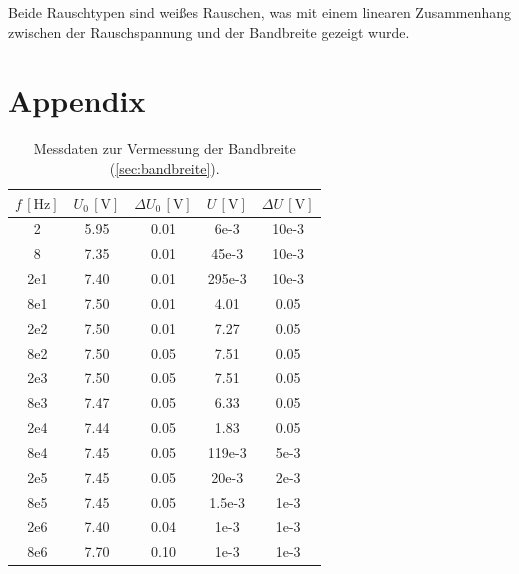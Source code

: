 \documentclass[sn-mathphys-num,iicol]{sn-jnl}
\theoremstyle{thmstyleone}
\theoremstyle{thmstyletwo}
\theoremstyle{thmstylethree}
\begin{document}
Beide Rauschtypen sind weißes Rauschen, was mit einem linearen Zusammenhang zwischen der Rauschspannung und der Bandbreite gezeigt wurde.

\clearpage
\section{Appendix}
\begin{table}[h]
    \begin{tabular}{S[table-format=1.2e1] S[table-format=1.2] S[table-format=1.2] S[table-format=1.2e1] S[table-format=1.2e1]}
        \toprule
        {\(f\,[\si{\hertz}]\)} & {\(U_0\,[\si{\volt}]\)} & {\(\Delta U_0\,[\si{\volt}]\)} & {\(U\,[\si{\volt}]\)} & {\(\Delta U\,[\si{\volt}]\)} \\
                & 5.95 & 0.01 & 6e-3   & 10e-3 \\
        8        & 7.35 & 0.01 & 45e-3  & 10e-3 \\
        2e1      & 7.40 & 0.01 & 295e-3 & 10e-3 \\
        8e1      & 7.50 & 0.01 & 4.01   & 0.05  \\
        2e2      & 7.50 & 0.01 & 7.27   & 0.05  \\
        8e2      & 7.50 & 0.05 & 7.51   & 0.05  \\
        2e3      & 7.50 & 0.05 & 7.51   & 0.05  \\
        8e3      & 7.47 & 0.05 & 6.33   & 0.05  \\
        2e4      & 7.44 & 0.05 & 1.83   & 0.05  \\
        8e4      & 7.45 & 0.05 & 119e-3 & 5e-3  \\
        2e5      & 7.45 & 0.05 & 20e-3  & 2e-3  \\
        8e5      & 7.45 & 0.05 & 1.5e-3 & 1e-3  \\
        2e6      & 7.40 & 0.04 & 1e-3   & 1e-3  \\
        8e6      & 7.70 & 0.10 & 1e-3   & 1e-3  \\
        \bottomrule
    \end{tabular}
    \caption{Messdaten zur Vermessung der Bandbreite (\ref{sec:bandbreite}).}
    \label{tab:frequency_data}
\end{table}
\end{document}
